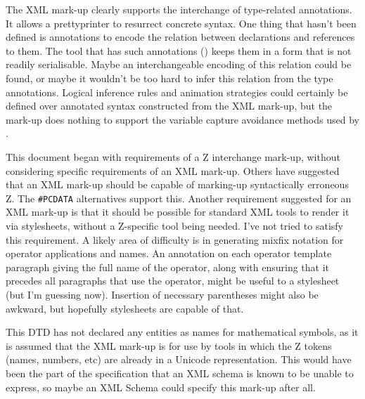 \documentclass[a4paper,10pt]{article}
\begin{document}
The XML mark-up clearly supports the interchange of type-related annotations.
It allows a prettyprinter to resurrect concrete syntax.
One thing that hasn't been defined is annotations to encode
the relation between declarations and references to them.
The tool that has such annotations (\CADiZ)
keeps them in a form that is not readily serialisable.
Maybe an interchangeable encoding of this relation could be found,
or maybe it wouldn't be too hard to infer this relation
from the type annotations.
Logical inference rules and animation strategies could certainly
be defined over annotated syntax constructed from the XML mark-up,
but the mark-up does nothing to support
the variable capture avoidance methods used by \CADiZ.

This document began with requirements of a Z interchange mark-up,
without considering specific requirements of an XML mark-up.
Others have suggested that an XML mark-up should be capable of
marking-up syntactically erroneous Z.
The \verb!#PCDATA! alternatives support this.
Another requirement suggested for an XML mark-up is that it
should be possible for standard XML tools to render it via stylesheets,
without a Z-specific tool being needed.
I've not tried to satisfy this requirement.
A likely area of difficulty is in generating mixfix notation
for operator applications and names.
An annotation on each operator template paragraph
giving the full name of the operator,
along with ensuring that it precedes all paragraphs that use the operator,
might be useful to a stylesheet (but I'm guessing now).
Insertion of necessary parentheses might also be awkward,
but hopefully stylesheets are capable of that.

This DTD has not declared any entities as names for mathematical symbols,
as it is assumed that the XML mark-up is for use by tools
in which the Z tokens (names, numbers, etc)
are already in a Unicode representation.
This would have been the part of the specification that an XML schema
is known to be unable to express,
so maybe an XML Schema could specify this mark-up after all.

%
%


\end{document}
